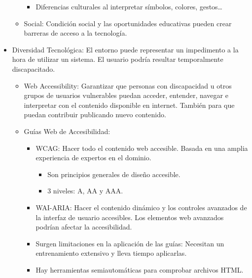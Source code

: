 \documentclass[12pt, twoside, openright]{report} %
\begin{document}
\begin{itemize}
\begin{itemize}
\begin{itemize}
			            \item Diferencias culturales al interpretar símbolos, colores,
			                  gestos\ldots{}
		            \end{itemize}

		      \item Social: Condición social y las oportunidades educativas pueden
		            crear barreras de acceso a la tecnología.
	      \end{itemize}
	\item Diversidad Tecnológica: El entorno puede representar un impedimento
	      a la hora de utilizar un sistema. El usuario podría resultar
	      temporalmente discapacitado.

	      \begin{itemize}
		      \item Web Accessibility: Garantizar que personas con discapacidad u
		            otros grupos de usuarios vulnerables puedan acceder, entender,
		            navegar e interpretar con el contenido disponible en internet.
		            También para que puedan contribuir publicando nuevo contenido.

		      \item Guías Web de Accesibilidad:

		            \begin{itemize}
			            \item WCAG: Hacer todo el contenido web accesible. Basada en una
			                  amplia experiencia de expertos en el dominio.

			                  \begin{itemize}
				                  \item Son principios generales de diseño accesible.

				                  \item 3 niveles: A, AA y AAA.
			                  \end{itemize}

			            \item WAI-ARIA: Hacer el contenido dinámico y los controles avanzados
			                  de la interfaz de usuario accesibles. Los elementos web
			                  avanzados podrían afectar la accesibilidad.

			            \item Surgen limitaciones en la aplicación de las guías: Necesitan un
			                  entrenamiento extensivo y lleva tiempo aplicarlas.

			            \item Hay herramientas semiautomáticas para comprobar archivos HTML.
		            \end{itemize}
	      \end{itemize}
\end{itemize}
\end{document}
